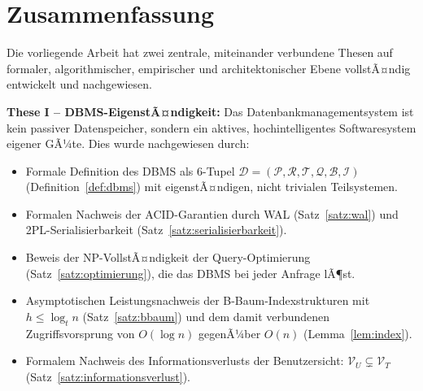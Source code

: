 ﻿\documentclass[a4paper,12pt]{article}
\theoremstyle{definition}
\begin{document}
\section{Zusammenfassung}
\label{sec:zusammenfassung}

Die vorliegende Arbeit hat zwei zentrale, miteinander verbundene Thesen auf formaler, algorithmischer, empirischer und architektonischer Ebene vollstÃ¤ndig entwickelt und nachgewiesen.

\textbf{These I -- DBMS-EigenstÃ¤ndigkeit:} Das Datenbankmanagementsystem ist kein passiver Datenspeicher, sondern ein aktives, hochintelligentes Softwaresystem eigener GÃ¼te. Dies wurde nachgewiesen durch:
\begin{itemize}
  \item Formale Definition des DBMS als 6-Tupel $\mathcal{D} = (\mathcal{P}, \mathcal{R}, \mathcal{T}, \mathcal{Q}, \mathcal{B}, \mathcal{I})$ (Definition~\ref{def:dbms}) mit eigenstÃ¤ndigen, nicht trivialen Teilsystemen.
  \item Formalen Nachweis der ACID-Garantien durch WAL (Satz~\ref{satz:wal}) und 2PL-Serialisierbarkeit (Satz~\ref{satz:serialisierbarkeit}).
  \item Beweis der NP-VollstÃ¤ndigkeit der Query-Optimierung (Satz~\ref{satz:optimierung}), die das DBMS bei jeder Anfrage lÃ¶st.
  \item Asymptotischen Leistungsnachweis der B-Baum-Indexstrukturen mit $h \leq \log_t n$ (Satz~\ref{satz:bbaum}) und dem damit verbundenen Zugriffsvorsprung von $O(\log n)$ gegenÃ¼ber $O(n)$ (Lemma~\ref{lem:index}).
  \item Formalem Nachweis des Informationsverlusts der Benutzersicht: $\mathcal{V}_U \subsetneq \mathcal{V}_T$ (Satz~\ref{satz:informationsverlust}).
\end{itemize}
\end{document}
